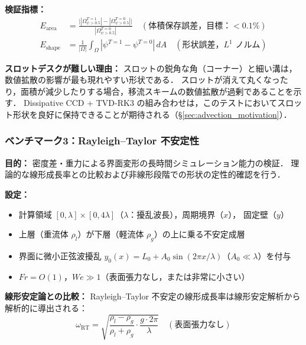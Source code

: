 \textbf{検証指標：}
\begin{align}
  E_{\text{area}} &= \frac{\bigl||\Omega_{\psi>0.5}^{T=1}| - |\Omega_{\psi>0.5}^{T=0}|\bigr|}{|\Omega_{\psi>0.5}^{T=0}|}
  \quad (\text{体積保存誤差，目標：} < 0.1\%) \\
  E_{\text{shape}} &= \frac{1}{|\Omega|}\int_\Omega |\psi^{T=1} - \psi^{T=0}|\,dA
  \quad (\text{形状誤差，$L^1$ ノルム})
\end{align}

\noindent\textbf{スロットデスクが難しい理由：}
スロットの鋭角な角（コーナー）と細い溝は，数値拡散の影響が最も現れやすい形状である．
スロットが消えて丸くなったり，面積が減少したりする場合，移流スキームの数値拡散が過剰であることを示す．
Dissipative CCD + TVD-RK3 の組み合わせは，このテストにおいてスロット形状を良好に保持できることが期待される（§\ref{sec:advection_motivation}）．

\subsubsection{ベンチマーク3：Rayleigh--Taylor 不安定性}
\label{sec:bench_rt}

\textbf{目的：} 密度差・重力による界面変形の長時間シミュレーション能力の検証．
理論的な線形成長率との比較および非線形段階での形状の定性的確認を行う．

\textbf{設定：}
\begin{itemize}
  \item 計算領域 $[0, \lambda] \times [0, 4\lambda]$（$\lambda$：擾乱波長），周期境界（$x$），
        固定壁（$y$）
  \item 上層（重流体 $\rho_l$）が下層（軽流体 $\rho_g$）の上に乗る不安定成層
  \item 界面に微小正弦波擾乱 $y_0(x) = L_0 + A_0\sin(2\pi x/\lambda)$（$A_0 \ll \lambda$）を付与
  \item $Fr = O(1)$，$We \gg 1$（表面張力なし，または非常に小さい）
\end{itemize}

\textbf{線形安定論との比較：}
Rayleigh--Taylor 不安定の線形成長率は線形安定解析から解析的に導出される：
\begin{equation}
  \omega_{\text{RT}} = \sqrt{\frac{\rho_l - \rho_g}{\rho_l + \rho_g} \cdot \frac{g \cdot 2\pi}{\lambda}}
  \quad (\text{表面張力なし})
  \label{eq:rt_growth}
\end{equation}

